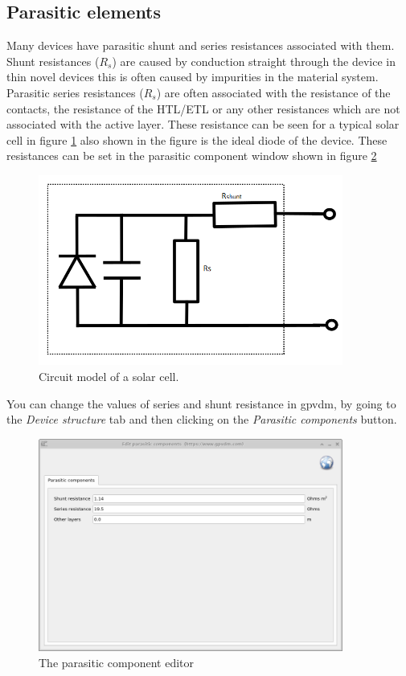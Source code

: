 \newpage
\subsection{Parasitic elements}
\label{sec:parasitic}

Many devices have parasitic shunt and series resistances associated with them.  Shunt resistances ($R_{s}$) are caused by conduction straight through the device in thin novel devices this is often caused by impurities in the material system.  Parasitic series resistances ($R_{s}$) are often associated with the resistance of the contacts, the resistance of the HTL/ETL or any other resistances which are not associated with the active layer.  These resistance can be seen for a typical solar cell in figure \ref{fig:parasitic_circuit} also shown in the figure is the ideal diode of the device. These resistances can be set in the parasitic component window shown in figure \ref{fig:parasitic}


\begin{figure}[h!]
\centering
\includegraphics[width=100mm]{./images/parasitic_circuit.png}
\caption{Circuit model of a solar cell.}
\label{fig:parasitic_circuit}
\end{figure}


You can change the values of series and shunt resistance in gpvdm, by going to the \emph{Device structure} tab and then clicking on the \emph{Parasitic components} button.

\begin{figure}[H]
\centering
\includegraphics[width=100mm,height=70mm]{./images/parasitic.png}
\caption{The parasitic component editor}
\label{fig:parasitic}
\end{figure}

